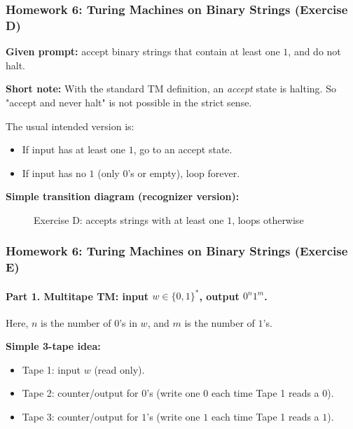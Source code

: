 \documentclass{article}
\theoremstyle{theorem}
\theoremstyle{definition}
\theoremstyle{remark}
\begin{document}
\subsubsection{Homework 6: Turing Machines on Binary Strings (Exercise D)}

\textbf{Given prompt:} accept binary strings that contain at least one $1$, and do not halt.

\textbf{Short note:}
With the standard TM definition, an \emph{accept} state is halting. So "accept and never halt" is not possible in the strict sense.

The usual intended version is:
\begin{itemize}
  \item If input has at least one $1$, go to an accept state.
  \item If input has no $1$ (only $0$'s or empty), loop forever.
\end{itemize}

\textbf{Simple transition diagram (recognizer version):}

\begin{figure}[H]
  \centering
  \caption{Exercise D: accepts strings with at least one $1$, loops otherwise}
\end{figure}

\subsubsection{Homework 6: Turing Machines on Binary Strings (Exercise E)}

\paragraph{Part 1. Multitape TM: input $w\in\{0,1\}^*$, output $0^n1^m$.}
Here, $n$ is the number of $0$'s in $w$, and $m$ is the number of $1$'s.

\textbf{Simple 3-tape idea:}
\begin{itemize}
  \item Tape 1: input $w$ (read only).
  \item Tape 2: counter/output for $0$'s (write one $0$ each time Tape 1 reads a $0$).
  \item Tape 3: counter/output for $1$'s (write one $1$ each time Tape 1 reads a $1$).
\end{itemize}
\end{document}
